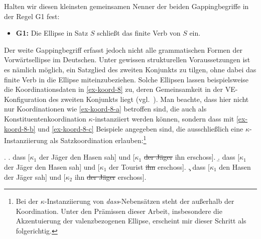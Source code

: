 Halten wir diesen kleinsten gemeinsamen Nenner der beiden Gappingbegriffe in der Regel G1 fest:
\begin{itemize}
  \item[] {\bf G1:} Die Ellipse in Satz $S$ schlie\ss t das finite Verb von $S$ ein.
\end{itemize}
Der weite Gappingbegriff erfasst jedoch nicht alle grammatischen Formen der Vorwärtsellipse im Deutschen. Unter gewissen strukturellen Voraussetzungen ist es nämlich möglich, ein Satzglied des zweiten Konjunkts zu tilgen, ohne dabei das finite Verb in die Ellipse miteinzubeziehen. Solche Ellipsen lassen beispielsweise die Koordinationsdaten in \ref{ex-koord-8} zu, deren Gemeinsamkeit in der VE-Konfiguration des zweiten Konjunkts liegt (vgl.\ \citealt{Wilder:94,Wilder:97}). Man beachte, dass hier nicht nur Koordinationen wie \ref{ex-koord-8-a} betroffen sind, die auch als Konstituentenkoordination $\kappa$-instanziiert werden können, sondern dass mit \ref{ex-koord-8-b} und \ref{ex-koord-8-c} Beispiele angegeben sind, die ausschlie\ss lich eine $\kappa$-Instanziierung als Satzkoordination erlauben:\footnote{Bei der $\kappa$-Instanziierung von \emph{dass}-Nebensätzen steht der  au\ss erhalb der Koordination. Unter den Prämissen dieser Arbeit, insbesondere die Akzentuierung der valenzbezogenen Ellipse, erscheint mir dieser Schritt als folgerichtig.} 

\ex. \label{ex-koord-8}
\a. \label{ex-koord-8-a}dass [$\kappa_1$ der Jäger den Hasen sah] und [$\kappa_1$ \sout{der Jäger} ihn erschoss].
\b. \label{ex-koord-8-b}dass [$\kappa_1$ der Jäger den Hasen sah] und [$\kappa_1$ der Tourist \sout{ihn} erschoss].
\c. \label{ex-koord-8-c}dass [$\kappa_1$ den Hasen der Jäger sah] und [$\kappa_2$ ihn \sout{der Jäger} erschoss].


